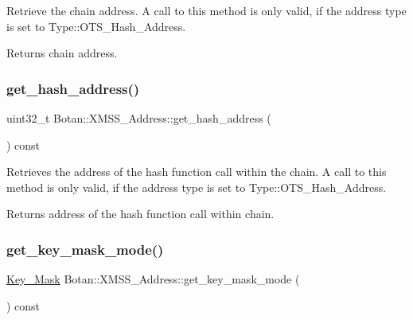 Retrieve the chain address. A call to this method is only valid, if the address type is set to Type\+::\+O\+T\+S\+\_\+\+Hash\+\_\+\+Address.

\begin{DoxyReturn}{Returns}
chain address. 
\end{DoxyReturn}
\mbox{\label{class_botan_1_1_x_m_s_s___address_af6ac58ed613b3b523628ccfcde73f7c2}} 
\subsubsection{\texorpdfstring{get\+\_\+hash\+\_\+address()}{get\_hash\_address()}}
{\footnotesize\ttfamily uint32\+\_\+t Botan\+::\+X\+M\+S\+S\+\_\+\+Address\+::get\+\_\+hash\+\_\+address (\begin{DoxyParamCaption}{ }\end{DoxyParamCaption}) const\hspace{0.3cm}{\ttfamily [inline]}}

Retrieves the address of the hash function call within the chain. A call to this method is only valid, if the address type is set to Type\+::\+O\+T\+S\+\_\+\+Hash\+\_\+\+Address.

\begin{DoxyReturn}{Returns}
address of the hash function call within chain. 
\end{DoxyReturn}
\mbox{\label{class_botan_1_1_x_m_s_s___address_af74b11e3ced49d405e2c84ca51191d61}} 
\subsubsection{\texorpdfstring{get\+\_\+key\+\_\+mask\+\_\+mode()}{get\_key\_mask\_mode()}}
{\footnotesize\ttfamily \hyperlink{class_botan_1_1_x_m_s_s___address_a85146c0c3e049f62c413194049f501e3}{Key\+\_\+\+Mask} Botan\+::\+X\+M\+S\+S\+\_\+\+Address\+::get\+\_\+key\+\_\+mask\+\_\+mode (\begin{DoxyParamCaption}{ }\end{DoxyParamCaption}) const\hspace{0.3cm}{\ttfamily [inline]}}

